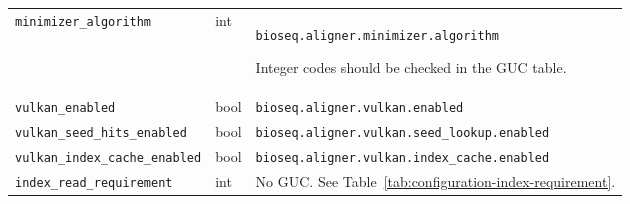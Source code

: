 \begin{longtable}{@{}>{\raggedright\arraybackslash}p{.28\linewidth}>{\raggedright\arraybackslash}p{.10\linewidth}>{\raggedright\arraybackslash}p{}@{}}
\nolinkurl{minimizer_algorithm} & int & \nolinkurl{bioseq.aligner.minimizer.algorithm}\par Integer codes should be checked in the GUC table.\\[3pt]
\nolinkurl{vulkan_enabled} & bool & \nolinkurl{bioseq.aligner.vulkan.enabled}\\[3pt]
\nolinkurl{vulkan_seed_hits_enabled} & bool & \nolinkurl{bioseq.aligner.vulkan.seed_lookup.enabled}\\[3pt]
\nolinkurl{vulkan_index_cache_enabled} & bool & \nolinkurl{bioseq.aligner.vulkan.index_cache.enabled}\\[3pt]
\nolinkurl{index_read_requirement} & int & No GUC. See Table~\ref{tab:configuration-index-requirement}.\\[3pt]
\end{longtable}
\endgroup
